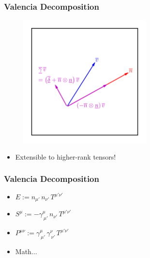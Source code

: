 \documentclass{beamer}
\begin{document}
\begin{frame}
\frametitle{Valencia Decomposition}

  \begin{figure}[htb!]
    \centering
    \includegraphics[width=0.6\textwidth]{fig.decomp.png}
  \end{figure}

  \begin{itemize}[<+->]
    \item[]
     Extensible to higher-rank tensors!
  \end{itemize}

\end{frame}

\begin{frame}
\frametitle{Valencia Decomposition}

  \begin{itemize}[<+->]
    \item[]
      $E:=n_{\mu'}\,n_{\nu'}\,T^{\mu'\nu'}$\vspace{1em}
    \item[]
      $S^{\mu}:=-\gamma^{\mu}_{~\mu'}\,n_{\nu'}\,T^{\mu'\nu'}$\vspace{1em}
    \item[]
      $P^{\mu\nu}:=\gamma^{\mu}_{~\mu'}\,\gamma^{\nu}_{~\nu'}\,
      T^{\mu'\nu'}$\vspace{1em}
    \item[]
      Math...
  \end{itemize}

\end{frame}
\end{document}
